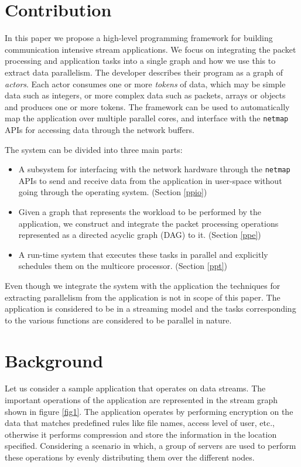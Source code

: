\documentclass[conference]{IEEEtran}
\begin{document}
\section{Contribution}

In this paper we propose a high-level programming framework for building communication intensive stream applications. We focus on integrating the packet processing and application tasks into a single graph and how we use this to extract data parallelism. The developer describes their program as a graph of \textit{actors}. Each actor consumes one or more \textit{tokens} of data, which may be simple data such as integers, or more complex data such as packets, arrays or objects and produces one or more tokens. The framework can be used to automatically map the application over multiple parallel cores, and interface with the \texttt{netmap} APIs \cite{Rizzo:2012:RNI:2090147.2103536} for accessing data through the network buffers.

The system can be divided into three main parts:

\begin{itemize} 
\item A subsystem for interfacing with the network hardware through the \texttt{netmap} APIs to send and receive data from the application in user-space without going through the operating system. (Section \ref{ppio}) 
\item Given a graph that represents the workload to be performed by the application, we construct and integrate the packet processing operations represented as a directed acyclic graph (DAG) to it. (Section \ref{ppe})
\item A run-time system that executes these tasks in parallel and explicitly schedules them on the multicore processor. (Section \ref{ppt})
\end{itemize}

Even though we integrate the system with the application the techniques for extracting parallelism from the application is not in scope of this paper. The application is considered to be in a streaming model and the tasks corresponding to the various functions are considered to be parallel in nature.

\section{Background}

Let us consider a sample application that operates on data streams. The important operations of the application are represented in the stream graph shown in figure \ref{fig1}. The application operates by performing encryption on the data that matches predefined rules like file names, access level of user, etc., otherwise it performs compression and store the information in the location specified. Considering a scenario in which, a group of servers are used to perform these operations by evenly distributing them over the different nodes.
\end{document}
